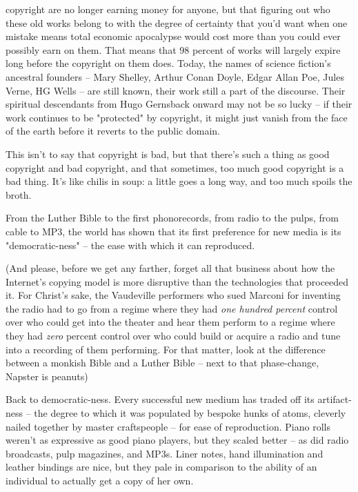 \begin{itemize}
  copyright are no longer earning money for anyone, but that figuring
  out who these old works belong to with the degree of certainty that
  you'd want when one mistake means total economic apocalypse would
  cost more than you could ever possibly earn on them. That means
  that 98 percent of works will largely expire long before the
  copyright on them does. Today, the names of science fiction's
  ancestral founders -- Mary Shelley, Arthur Conan Doyle, Edgar Allan
  Poe, Jules Verne, HG Wells -- are still known, their work still a
  part of the discourse. Their spiritual descendants from Hugo
  Gernsback onward may not be so lucky -- if their work continues to
  be "protected" by copyright, it might just vanish from the face of
  the earth before it reverts to the public domain.
\end{itemize}
This isn't to say that copyright is bad, but that there's such a
thing as good copyright and bad copyright, and that sometimes, too
much good copyright is a bad thing. It's like chilis in soup: a
little goes a long way, and too much spoils the broth.

From the Luther Bible to the first phonorecords, from radio to the
pulps, from cable to MP3, the world has shown that its first
preference for new media is its "democratic-ness" -- the ease with
which it can reproduced.

(And please, before we get any farther, forget all that business
about how the Internet's copying model is more disruptive than the
technologies that proceeded it. For Christ's sake, the Vaudeville
performers who sued Marconi for inventing the radio had to go from
a regime where they had \emph{one hundred percent} control over
who could get into the theater and hear them perform to a regime
where they had \emph{zero} percent control over who could build
or acquire a radio and tune into a recording of them performing.
For that matter, look at the difference between a monkish Bible and
a Luther Bible -- next to that phase-change, Napster is peanuts)

Back to democratic-ness. Every successful new medium has traded off
its artifact-ness -- the degree to which it was populated by
bespoke hunks of atoms, cleverly nailed together by master
craftspeople -- for ease of reproduction. Piano rolls weren't as
expressive as good piano players, but they scaled better -- as did
radio broadcasts, pulp magazines, and MP3s. Liner notes, hand
illumination and leather bindings are nice, but they pale in
comparison to the ability of an individual to actually get a copy
of her own.

